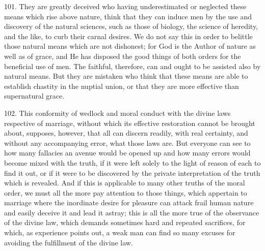 \documentclass[12pt,a4paper]{book}
\begin{document}
101. They are greatly deceived who having underestimated or neglected these means which rise above nature, think that they can induce men by the use and discovery of the natural sciences, such as those of biology, the science of heredity, and the like, to curb their carnal desires. We do not say this in order to belittle those natural means which are not dishonest; for God is the Author of nature as well as of grace, and He has disposed the good things of both orders for the beneficial use of men. The faithful, therefore, can and ought to be assisted also by natural means. But they are mistaken who think that these means are able to establish chastity in the nuptial union, or that they are more effective than supernatural grace.

102. This conformity of wedlock and moral conduct with the divine laws respective of marriage, without which its effective restoration cannot be brought about, supposes, however, that all can discern readily, with real certainty, and without any accompanying error, what those laws are. But everyone can see to how many fallacies an avenue would be opened up and how many errors would become mixed with the truth, if it were left solely to the light of reason of each to find it out, or if it were to be discovered by the private interpretation of the truth which is revealed. And if this is applicable to many other truths of the moral order, we must all the more pay attention to those things, which appertain to marriage where the inordinate desire for pleasure can attack frail human nature and easily deceive it and lead it astray; this is all the more true of the observance of the divine law, which demands sometimes hard and repeated sacrifices, for which, as experience points out, a weak man can find so many excuses for avoiding the fulfillment of the divine law.
\end{document}
